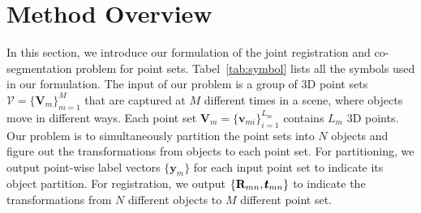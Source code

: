 \section{Method Overview}
\label{sec:method}
In this section, we introduce our formulation of the joint registration and co-segmentation problem for point sets. Tabel~\ref{tab:symbol} lists all the symbols used in our formulation. The input of our problem is a group of 3D point sets  $\mathcal{V}=\{\mathbf{V}_m\}^{M}_{m=1}$ that are captured at $M$ different times in a scene, where objects move in different ways. Each point set $\mathbf{V}_m=\{\pmb{v}_{mi}\}^{L_m}_{i=1}$ contains $L_m$ 3D points. Our problem is to simultaneously partition the point sets into $N$ objects and figure out the transformations from objects to each point set. For partitioning, we output point-wise label vectors $\{\pmb{y}_m\}$ for each input point set to indicate its object partition. For registration, we output $\{\mathbf{R}_{mn},\pmb{t}_{mn}\}$ to indicate the transformations from $N$ different objects to $M$ different point set.
